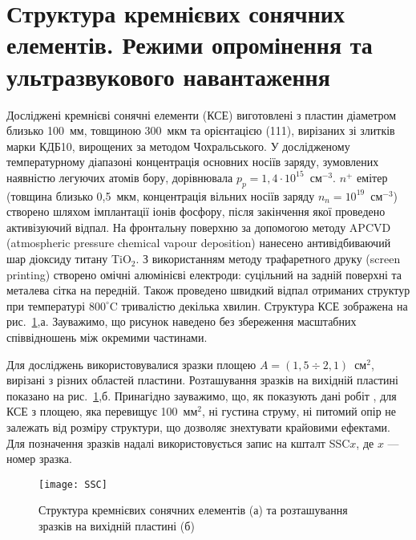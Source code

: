 \section{Структура кремнієвих сонячних елементів. Режими опромінення та ультразвукового навантаження\label{SSC}}
Досліджені кремнієві сонячні елементи (КСЕ) виготовлені з пластин діаметром близько 100~мм, товщиною 300~мкм та орієнтацією (111), вирізаних зі злитків марки КДБ10, вирощених за методом Чохральського.
У дослідженому температурному діапазоні концентрація основних носіїв заряду, зумовлених наявністю легуючих атомів бору, дорівнювала $p_p=1,4\cdot10^{15}$~см$^{-3}$.
$n^+$ емітер (товщина близько 0,5~мкм, концентрація вільних носіїв заряду $n_n=10^{19}$~см$^{-3}$) створено
шляхом імплантації іонів фосфору, після закінчення якої проведено активізуючий відпал.
На фронтальну поверхню за допомогою методу APCVD (atmospheric pressure chemical  vapour  deposition) нанесено антивідбиваючий шар діоксиду титану TiO$_2$.
З використанням методу трафаретного друку (screen printing) створено омічні алюмінієві електроди: суцільний на задній поверхні та металева сітка на передній.
Також проведено швидкий відпал отриманих структур при температурі $800^\circ$C тривалістю декілька хвилин.
Структура КСЕ зображена на рис.~\ref{figSSC},а.
Зауважимо, що рисунок наведено без збереження масштабних співвідношень між окремими частинами.




Для досліджень використовувалися зразки площею $A=(1,5\div2,1)$~см$^{2}$, вирізані з різних областей пластини.
Розташування зразків на вихідній пластині показано на рис.~\ref{figSSC},б.
Принагідно зауважимо, що, як показують дані робіт \cite{Breitenstein2013,SC:Area}, для КСЕ з площею, яка
перевищує 100~мм$^2$, ні густина струму, ні питомий опір не залежать від розміру структури, що
дозволяє знехтувати крайовими ефектами.
Для позначення зразків надалі використовується запис на кшталт SSC$x$, де $x$ --- номер зразка.


\begin{figure}
\center
\texttt{[image: SSC]}%
\caption{\label{figSSC}
Структура кремнієвих сонячних елементів (а) та розташування зразків на вихідній пластині (б)
}
\end{figure}


